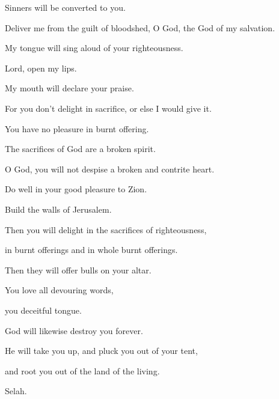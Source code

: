 {\par }{\QB Sinners will be converted to you.
\par }{\Q {}Deliver me from the guilt of bloodshed, O God, the God of my salvation.
\par }{\QB My tongue will sing aloud of your righteousness.
\par }{\Q {}Lord, open my lips.
\par }{\QB My mouth will declare your praise.
\par }{\Q {}For you don’t delight in sacrifice, or else I would give it.
\par }{\QB You have no pleasure in burnt offering.
\par }{\Q {}The sacrifices of God are a broken spirit.
\par }{\QB O God, you will not despise a broken and contrite heart.
\par }{\BB \par }{\Q {}Do well in your good pleasure to Zion.
\par }{\QB Build the walls of Jerusalem.
\par }{\Q {}Then you will delight in the sacrifices of righteousness,
\par }{\QB in burnt offerings and in whole burnt offerings.
\par }{\Q Then they will offer bulls on your altar.

\par }
{\Q {}You love all devouring words,
\par }{\QB you deceitful tongue.
\par }{\Q {}God will likewise destroy you forever.
\par }{\QB He will take you up, and pluck you out of your tent,
\par }{\QB and root you out of the land of the living.
\par }{\QS Selah.\par }
